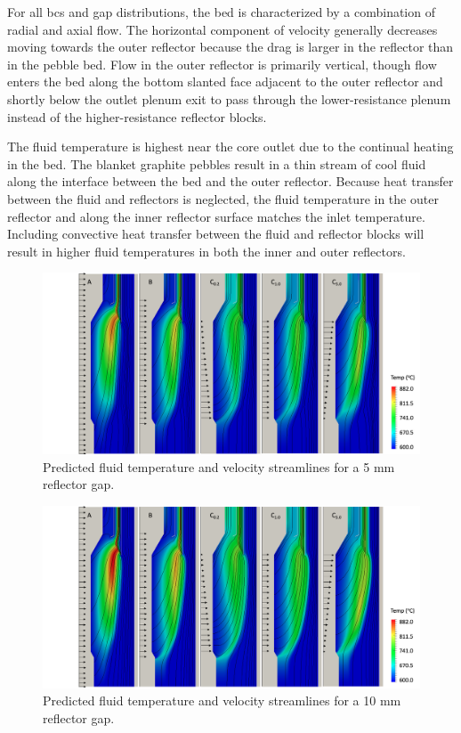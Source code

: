 For all \glspl{bc} and gap distributions, the bed is characterized by a combination of radial and axial flow. The horizontal component of velocity generally decreases moving towards the outer reflector because the drag is larger in the reflector than in the pebble bed. Flow in the outer reflector is primarily vertical, though flow enters the bed along the bottom slanted face adjacent to the outer reflector and shortly below the outlet plenum exit to pass through the lower-resistance plenum instead of the higher-resistance reflector blocks.

The fluid temperature is highest near the core outlet due to the continual heating in the bed. The blanket graphite pebbles result in a thin stream of cool fluid along the interface between the bed and the outer reflector. Because heat transfer between the fluid and reflectors is neglected, the fluid temperature in the outer reflector and along the inner reflector surface matches the inlet temperature. Including convective heat transfer between the fluid and reflector blocks will result in higher fluid temperatures in both the inner and outer reflectors.

\begin{figure}[!htb]
\centering
\includegraphics[width=0.85\linewidth]{figs/fluid_temp_05.png}
\caption{Predicted fluid temperature and velocity streamlines for a 5 \si{\milli\meter} reflector gap.}
\label{fig:bcs_temp}
\end{figure}

\begin{figure}[!htb]
\centering
\includegraphics[width=0.85\linewidth]{figs/fluid_temp_1.png}
\caption{Predicted fluid temperature and velocity streamlines for a 10 \si{\milli\meter} reflector gap.}
\label{fig:bcs_temp2}
\end{figure}


